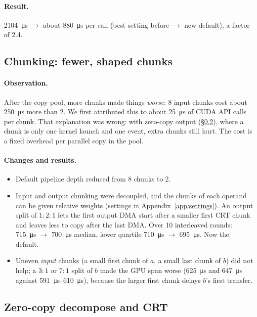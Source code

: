 \documentclass[11pt,a4paper]{article}
\newcommand{\us}[1]{\SI{#1}{\micro\second}}
\begin{document}
\paragraph{Result.} \us{2104} $\to$ about \us{880} per call (best setting before
$\to$ new default), a factor of 2.4.

\subsection{Chunking: fewer, shaped chunks}

\paragraph{Observation.} After the copy pool, more chunks made things \emph{worse}:
8 input chunks cost about \us{250} more than 2. We first attributed this to about
\us{25} of CUDA API calls per chunk. That explanation was wrong: with zero-copy
output (\S\ref{sec:zerocopy}), where a chunk is only one kernel launch and one event,
extra chunks still hurt. The cost is a fixed overhead per parallel copy in the pool.

\paragraph{Changes and results.}
\begin{itemize}[leftmargin=*]
\item Default pipeline depth reduced from 8 chunks to 2.
\item Input and output chunking were decoupled, and the chunks of each operand can
  be given relative weights (settings in Appendix~\ref{app:settings}). An output split of $1{:}2{:}1$ lets the first output
  DMA start after a smaller first CRT chunk and leaves less to copy after the last
  DMA. Over 10 interleaved rounds: \us{715} $\to$ \us{700} median, lower quartile
  \us{710} $\to$ \us{695}. Now the default.
\item Uneven \emph{input} chunks (a small first chunk of $a$, a small last chunk of
  $b$) did not help; a $3{:}1$ or $7{:}1$ split of $b$ made the GPU span worse
  (\us{625} and \us{647} against \us{591}--\us{610}), because the larger first chunk
  delays $b$'s first transfer.
\end{itemize}

\subsection{Zero-copy decompose and CRT}\label{sec:zerocopy}
\end{document}
